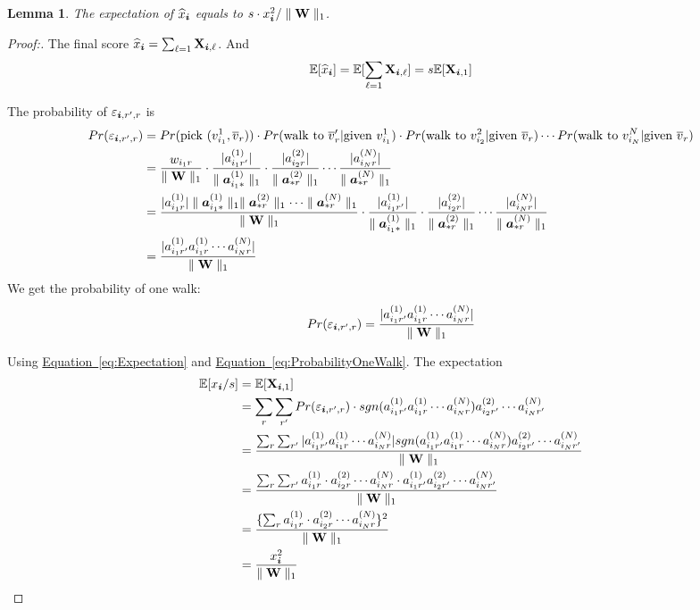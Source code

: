 \documentclass{article}
\newcommand{\Sca}[3]{{#1}^{(#2)}_{i_#2#3}}%
\newcommand{\V}[1]{{\bm{{\MakeLowercase{#1}}}}}
\newcommand{\VnC}[3]{\V{#1}^{(#2)}_{#3}}
\newcommand{\M}[1]{{\bm{\mathbf{\MakeUppercase{#1}}}}}
\newcommand{\norm}[2]{\parallel#1\parallel_{#2}}
\newcommand{\Eqn}[1] {\hyperref[eq:#1]  {Equation~\ref*{eq:#1}}}
\newtheorem{lemma}{Lemma}[section]
\begin{document}
\begin{lemma}\label{lem:Expectation}
The expectation of $\widehat{x}_{\V{i}}$ equals to $s\cdot x^2_{\V{i}}/\norm{\M{W}}{1}$.
\end{lemma}
\begin{proof}[Proof:]
The final score $\widehat{x}_{\V{i}} = \sum_{\ell=1}\M{X}_{\V{i},\ell}$. And
\begin{equation}\label{eq:Expectation}
\mathbb{E}[\widehat{x}_{\V{i}}] = \mathbb{E}[\sum_{\ell=1}\M{X}_{\V{i},\ell}]=s\mathbb{E}[\M{X}_{\V{i},1}]
\end{equation}

The probability of $\varepsilon_{\V{i},r',r}$ is
\begin{align*}
Pr(\varepsilon_{\V{i},r',r})
& = Pr( {\rm pick\ } (v^1_{i_1},\overline{v}_r))\cdot
Pr( {\rm walk\ to\ } \overline{v}_r' | {\rm given\ }v^1_{i_1} )\cdot
Pr( {\rm walk\ to\ } v^2_{i_2} | {\rm given\ }\overline{v}_r) \cdots Pr( {\rm walk\ to\ } v^N_{i_N} | {\rm given\ }\overline{v}_r ) \\
&=\frac{w_{i_1r}}{\norm{\M{W}}{1}}\cdot
  \frac{|\Sca{a}{1}{r'}|}{\norm{{\VnC{a}{1}{i_1*}}}{1}}\cdot
  \frac{|\Sca{a}{2}{r}|}{\norm{{\VnC{a}{2}{*r}}}{1}}\cdots
  \frac{|\Sca{a}{N}{r}|}{\norm{{\VnC{a}{N}{*r}}}{1}}\\
&=\frac{    |\Sca{a}{1}{r}|\norm{{\VnC{a}{1}{i_1*}}}{1}\norm{{\VnC{a}{2}{*r}}}{1}\cdots\norm{{\VnC{a}{N}{*r}}}{1}   }{  \norm{\M{W}}{1}  }\cdot
  \frac{|\Sca{a}{1}{r'}|}{\norm{{\VnC{a}{1}{i_1*}}}{1}}\cdot
\frac{|\Sca{a}{2}{r}|}{\norm{{\VnC{a}{2}{*r}}}{1}}\cdots
  \frac{|\Sca{a}{N}{r}|}{\norm{{\VnC{a}{N}{*r}}}{1}}\\
&=\frac{    |\Sca{a}{1}{r'}\Sca{a}{1}{r}\cdots\Sca{a}{N}{r}|    }{\norm{\M{W}}{1}}
\end{align*}
We get the probability of one walk:
\begin{equation}\label{eq:ProbabilityOneWalk}
Pr(\varepsilon_{\V{i},r',r})=\frac{|\Sca{a}{1}{r'}\Sca{a}{1}{r}\cdots\Sca{a}{N}{r}|}{\norm{\M{W}}{1}}
\end{equation}

Using \Eqn{Expectation} and \Eqn{ProbabilityOneWalk}. The expectation
\begin{align*}
\mathbb{E}[x_{\V{i}}/s]
&= \mathbb{E}[\M{X}_{\V{i},1}]\\
&=\sum_{r}\sum_{r'}Pr(\varepsilon_{\V{i},r',r})\cdot sgn(\Sca{a}{1}{r'}\Sca{a}{1}{r}\cdots\Sca{a}{N}{r})
\Sca{a}{2}{r'}\cdots\Sca{a}{N}{r'}\\
&=\frac{\sum_{r}\sum_{r'}|\Sca{a}{1}{r'}\Sca{a}{1}{r}\cdots\Sca{a}{N}{r}|sgn(\Sca{a}{1}{r'}\Sca{a}{1}{r}\cdots\Sca{a}{N}{r})
\Sca{a}{2}{r'}\cdots\Sca{a}{N}{r'}}{\norm{\M{W}}{1}}\\
&=\frac{\sum_{r}\sum_{r'} \Sca{a}{1}{r}\cdot\Sca{a}{2}{r}\cdots\Sca{a}{N}{r}\cdot\Sca{a}{1}{r'} \Sca{a}{2}{r'}\cdots\Sca{a}{N}{r'}}{\norm{\M{W}}{1}} \\
&=\frac{\{\sum_{r}\Sca{a}{1}{r}\cdot\Sca{a}{2}{r}\cdots\Sca{a}{N}{r}\}^2}{\norm{\M{W}}{1}}\\
&=\frac{x_{\V{i}}^2}{\norm{\M{W}}{1}}
\end{align*}
\end{proof}
\end{document}
